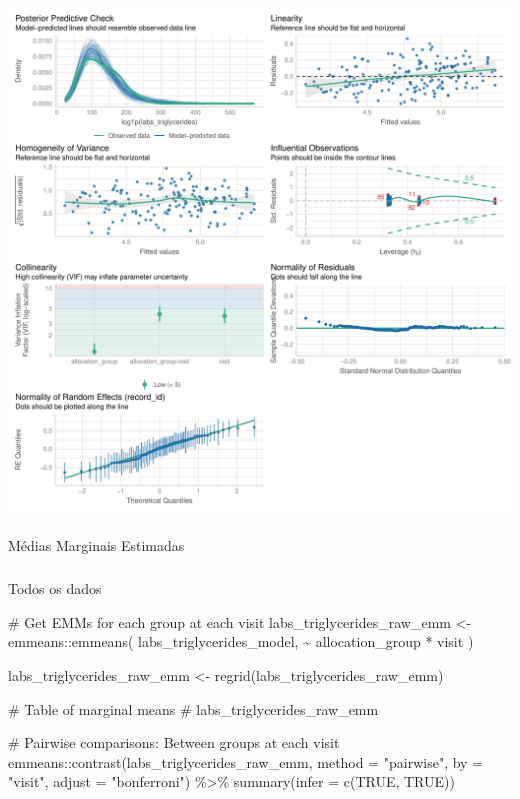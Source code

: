 \documentclass[
  12pt,
]{article}
\makeatletter
\let\oldparagraph\paragraph
\renewcommand{\paragraph}{
    \@ifstar
      \xxxParagraphStar
      \xxxParagraphNoStar
  }
\newcommand{\xxxParagraphStar}[1]{\oldparagraph*{#1}\mbox{}}
\newcommand{\xxxParagraphNoStar}[1]{\oldparagraph{#1}\mbox{}}
\let\oldsubparagraph\subparagraph
\renewcommand{\subparagraph}{
    \@ifstar
      \xxxSubParagraphStar
      \xxxSubParagraphNoStar
  }
\newcommand{\xxxSubParagraphStar}[1]{\oldsubparagraph*{#1}\mbox{}}
\newcommand{\xxxSubParagraphNoStar}[1]{\oldsubparagraph{#1}\mbox{}}
\newenvironment{Shaded}{\begin{snugshade}}{\end{snugshade}}
\newcommand{\AttributeTok}[1]{\textcolor[rgb]{0.40,0.45,0.13}{#1}}
\newcommand{\CommentTok}[1]{\textcolor[rgb]{0.37,0.37,0.37}{#1}}
\newcommand{\ConstantTok}[1]{\textcolor[rgb]{0.56,0.35,0.01}{#1}}
\newcommand{\FunctionTok}[1]{\textcolor[rgb]{0.28,0.35,0.67}{#1}}
\newcommand{\NormalTok}[1]{\textcolor[rgb]{0.00,0.23,0.31}{#1}}
\newcommand{\OtherTok}[1]{\textcolor[rgb]{0.00,0.23,0.31}{#1}}
\newcommand{\SpecialCharTok}[1]{\textcolor[rgb]{0.37,0.37,0.37}{#1}}
\newcommand{\StringTok}[1]{\textcolor[rgb]{0.13,0.47,0.30}{#1}}
\makeatother
\begin{document}
\includegraphics{Outcomes_files/figure-pdf/labs_triglycerides_4-2.pdf}

\paragraph{Médias Marginais
Estimadas}\label{muxe9dias-marginais-estimadas-7}

\subparagraph{Todos os dados}\label{todos-os-dados-7}

\begin{Shaded}
\begin{Highlighting}[]
\CommentTok{\# Get EMMs for each group at each visit}
\NormalTok{labs\_triglycerides\_raw\_emm }\OtherTok{\textless{}{-}}\NormalTok{ emmeans}\SpecialCharTok{::}\FunctionTok{emmeans}\NormalTok{(}
\NormalTok{    labs\_triglycerides\_model, }
    \SpecialCharTok{\textasciitilde{}}\NormalTok{ allocation\_group }\SpecialCharTok{*}\NormalTok{ visit}
\NormalTok{)}

\NormalTok{labs\_triglycerides\_raw\_emm }\OtherTok{\textless{}{-}} \FunctionTok{regrid}\NormalTok{(labs\_triglycerides\_raw\_emm)}

\CommentTok{\# Table of marginal means}
\CommentTok{\# labs\_triglycerides\_raw\_emm}

\CommentTok{\# Pairwise comparisons: Between groups at each visit}
\NormalTok{emmeans}\SpecialCharTok{::}\FunctionTok{contrast}\NormalTok{(labs\_triglycerides\_raw\_emm,}
\AttributeTok{method =} \StringTok{"pairwise"}\NormalTok{, }\AttributeTok{by =} \StringTok{"visit"}\NormalTok{,}
\AttributeTok{adjust =} \StringTok{"bonferroni"}\NormalTok{) }\SpecialCharTok{\%\textgreater{}\%} \FunctionTok{summary}\NormalTok{(}\AttributeTok{infer =} \FunctionTok{c}\NormalTok{(}\ConstantTok{TRUE}\NormalTok{, }\ConstantTok{TRUE}\NormalTok{))}
\end{Highlighting}
\end{Shaded}
\end{document}
